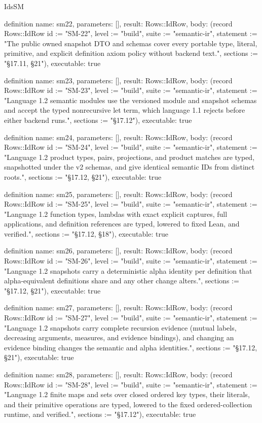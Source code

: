 \begin{lexlean}{IdsSM}
\begin{semanticmodule}
definition{
  name: sm22,
  parameters: [],
  result: Rows::IdRow,
  body: (record Rows::IdRow {id := "SM-22", level := "build", suite := "semantic-ir", statement := "The public owned snapshot DTO and schemas cover every portable type, literal, primitive, and explicit definition axiom policy without backend text.", sections := "§17.11, §21"}),
  executable: true
}

definition{
  name: sm23,
  parameters: [],
  result: Rows::IdRow,
  body: (record Rows::IdRow {id := "SM-23", level := "build", suite := "semantic-ir", statement := "Language 1.2 semantic modules use the versioned module and snapshot schemas and accept the typed nonrecursive let term, which language 1.1 rejects before either backend runs.", sections := "§17.12"}),
  executable: true
}

definition{
  name: sm24,
  parameters: [],
  result: Rows::IdRow,
  body: (record Rows::IdRow {id := "SM-24", level := "build", suite := "semantic-ir", statement := "Language 1.2 product types, pairs, projections, and product matches are typed, snapshotted under the v2 schemas, and give identical semantic IDs from distinct roots.", sections := "§17.12, §21"}),
  executable: true
}

definition{
  name: sm25,
  parameters: [],
  result: Rows::IdRow,
  body: (record Rows::IdRow {id := "SM-25", level := "build", suite := "semantic-ir", statement := "Language 1.2 function types, lambdas with exact explicit captures, full applications, and definition references are typed, lowered to fixed Lean, and verified.", sections := "§17.12, §18"}),
  executable: true
}

definition{
  name: sm26,
  parameters: [],
  result: Rows::IdRow,
  body: (record Rows::IdRow {id := "SM-26", level := "build", suite := "semantic-ir", statement := "Language 1.2 snapshots carry a deterministic alpha identity per definition that alpha-equivalent definitions share and any other change alters.", sections := "§17.12, §21"}),
  executable: true
}

definition{
  name: sm27,
  parameters: [],
  result: Rows::IdRow,
  body: (record Rows::IdRow {id := "SM-27", level := "build", suite := "semantic-ir", statement := "Language 1.2 snapshots carry complete recursion evidence (mutual labels, decreasing arguments, measures, and evidence bindings), and changing an evidence binding changes the semantic and alpha identities.", sections := "§17.12, §21"}),
  executable: true
}

definition{
  name: sm28,
  parameters: [],
  result: Rows::IdRow,
  body: (record Rows::IdRow {id := "SM-28", level := "build", suite := "semantic-ir", statement := "Language 1.2 finite maps and sets over closed ordered key types, their literals, and their primitive operations are typed, lowered to the fixed ordered-collection runtime, and verified.", sections := "§17.12"}),
  executable: true
}


\end{semanticmodule}
\end{lexlean}
